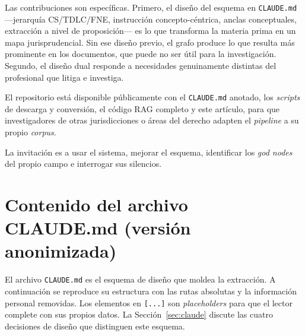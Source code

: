 \documentclass[12pt,a4paper]{article}
\begin{document}
Las contribuciones son específicas. Primero, el diseño del
esquema en \texttt{CLAUDE.md} —jerarquía CS/TDLC/FNE, instrucción
concepto-céntrica, anclas conceptuales, extracción a nivel de proposición— es
lo que transforma la materia prima en un mapa jurisprudencial. Sin ese diseño previo,
el grafo produce lo que resulta más prominente en los documentos, que puede no ser 
útil para la investigación. Segundo, el diseño dual 
responde a necesidades genuinamente distintas del profesional que litiga e investiga.

El repositorio está disponible públicamente con el \texttt{CLAUDE.md} anotado,
los \textit{scripts} de descarga y conversión, el código RAG completo y este
artículo, para que investigadores de otras jurisdicciones o áreas del derecho
adapten el \textit{pipeline} a su propio \textit{corpus}.

La invitación es a usar el sistema, mejorar el esquema, identificar
los \emph{god nodes} del propio campo e interrogar sus silencios.


\printbibliography


\appendix

\section{Contenido del archivo CLAUDE.md (versión anonimizada)}
\label{anx:claude-md}

El archivo \texttt{CLAUDE.md} es el esquema de diseño que moldea la extracción.
A continuación se reproduce su estructura con las rutas absolutas y la información
personal removidas. Los elementos en \texttt{[...]} son \emph{placeholders}
para que el lector complete con sus propios datos. La Sección~\ref{sec:claude}
discute las cuatro decisiones de diseño que distinguen este esquema.
\end{document}
